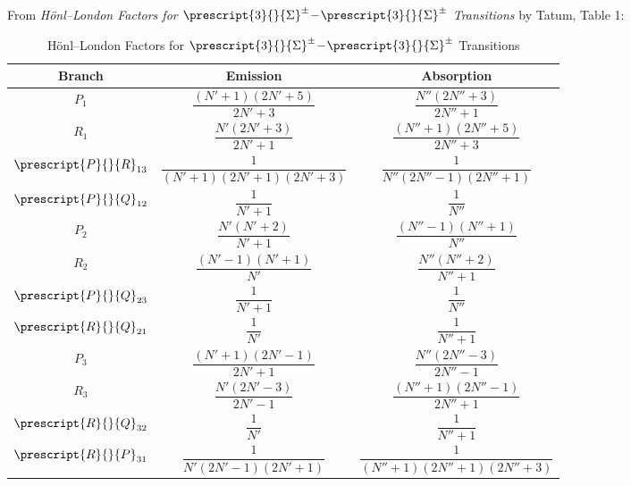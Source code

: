 \documentclass[11pt, twoside, fleqn]{report}
\newcommand{\dash}{\!-\!}
\newcommand{\state}[2]{\prescript{#1}{}{#2}}
\begin{document}
From \textit{H\"onl--London Factors for $\state{3}{\Sigma}^\pm\dash\state{3}{\Sigma}^\pm$ Transitions} by Tatum, Table 1:
\begin{table}[H]
    \centering
    \caption{H\"onl--London Factors for $\state{3}{\Sigma}^\pm\dash\state{3}{\Sigma}^\pm$ Transitions}
    \begin{tabular}{ccc}
        \toprule
        Branch              & Emission                                & Absorption                                 \\
        \midrule
        $P_{1}$             & $\dfrac{(N' + 1)(2N' + 5)}{2N' + 3}$    & $\dfrac{N''(2N'' + 3)}{2N'' + 1}$          \\
        \addlinespace[0.5em]
        $R_{1}$             & $\dfrac{N'(2N' + 3)}{2N' + 1}$          & $\dfrac{(N'' + 1)(2N'' + 5)}{2N'' + 3}$    \\
        \addlinespace[0.5em]
        $\state{P}{R}_{13}$ & $\dfrac{1}{(N' + 1)(2N' + 1)(2N' + 3)}$ & $\dfrac{1}{N''(2N'' - 1)(2N'' + 1)}$       \\
        \addlinespace[0.5em]
        $\state{P}{Q}_{12}$ & $\dfrac{1}{N' + 1}$                     & $\dfrac{1}{N''}$                           \\
        \addlinespace[0.5em]
        $P_{2}$             & $\dfrac{N'(N' + 2)}{N' + 1}$            & $\dfrac{(N'' - 1)(N'' + 1)}{N''}$          \\
        \addlinespace[0.5em]
        $R_{2}$             & $\dfrac{(N' - 1)(N' + 1)}{N'}$          & $\dfrac{N''(N'' + 2)}{N'' + 1}$            \\
        \addlinespace[0.5em]
        $\state{P}{Q}_{23}$ & $\dfrac{1}{N' + 1}$                     & $\dfrac{1}{N''}$                           \\
        \addlinespace[0.5em]
        $\state{R}{Q}_{21}$ & $\dfrac{1}{N'}$                         & $\dfrac{1}{N'' + 1}$                       \\
        \addlinespace[0.5em]
        $P_{3}$             & $\dfrac{(N' + 1)(2N' - 1)}{2N' + 1}$    & $\dfrac{N''(2N'' - 3)}{2N'' - 1}$          \\
        \addlinespace[0.5em]
        $R_{3}$             & $\dfrac{N'(2N' - 3)}{2N' - 1}$          & $\dfrac{(N'' + 1)(2N'' - 1)}{2N'' + 1}$    \\
        \addlinespace[0.5em]
        $\state{R}{Q}_{32}$ & $\dfrac{1}{N'}$                         & $\dfrac{1}{N'' + 1}$                       \\
        \addlinespace[0.5em]
        $\state{R}{P}_{31}$ & $\dfrac{1}{N'(2N' - 1)(2N' + 1)}$       & $\dfrac{1}{(N'' + 1)(2N'' + 1)(2N'' + 3)}$ \\
        \bottomrule
    \end{tabular}
\end{table}
\end{document}

